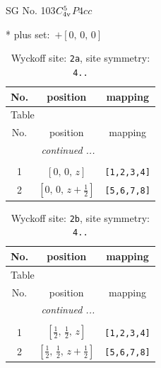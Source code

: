 \documentclass[fleqn,8pt]{jsarticle}
\begin{document}
\setcounter{MaxMatrixCols}{32}

\renewcommand{\tablename}{Table~}
\renewcommand{\figurename}{Figure~}
\begin{center}
\LARGE
SG No. 103\quad$C_{\rm 4v}^{5}$\quad$P4cc$\quad[ tetragonal ]
\end{center}
* plus set:\,\,\,$+\left[ 0,\, 0,\, 0 \right]$
\renewcommand{\arraystretch}{1.2}
\begin{longtable}{ccc}
\caption{Wyckoff site: {\tt 2a}, site symmetry: {\tt 4..}}
 \\
 \hline \hline
No. & position & mapping \\ \hline \endfirsthead

\multicolumn{2}{l}{\tablename\ \thetable{}} \\
 \hline \hline
No. & position & mapping \\ \hline \endhead

 \hline \hline
\multicolumn{2}{r}{\footnotesize\it continued ...} \\ \endfoot

 \hline \hline
\multicolumn{2}{r}{} \\ \endlastfoot

1 & $\left[ 0,\, 0,\, z \right]$ & {\tt [1,2,3,4]} \\ \hline
2 & $\left[ 0,\, 0,\, z + \frac{1}{2} \right]$ & {\tt [5,6,7,8]} \\
\end{longtable}
\renewcommand{\arraystretch}{1.2}
\begin{longtable}{ccc}
\caption{Wyckoff site: {\tt 2b}, site symmetry: {\tt 4..}}
 \\
 \hline \hline
No. & position & mapping \\ \hline \endfirsthead

\multicolumn{2}{l}{\tablename\ \thetable{}} \\
 \hline \hline
No. & position & mapping \\ \hline \endhead

 \hline \hline
\multicolumn{2}{r}{\footnotesize\it continued ...} \\ \endfoot

 \hline \hline
\multicolumn{2}{r}{} \\ \endlastfoot

1 & $\left[ \frac{1}{2},\, \frac{1}{2},\, z \right]$ & {\tt [1,2,3,4]} \\ \hline
2 & $\left[ \frac{1}{2},\, \frac{1}{2},\, z + \frac{1}{2} \right]$ & {\tt [5,6,7,8]} \\
\end{longtable}
\end{document}
